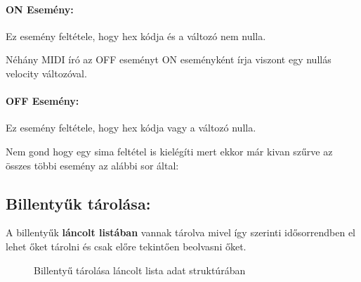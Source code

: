 \documentclass{article}
\begin{document}
\paragraph{ON Esemény:}
Ez esemény feltétele, hogy hex kódja 
és a  változó nem nulla.

\begin{cnote}[Megjegyzés:]
    Néhány MIDI író az OFF eseményt ON eseményként írja viszont
    egy nullás velocity változóval.
\end{cnote}

\paragraph{OFF Esemény:}
Ez esemény feltétele, hogy hex kódja 
vagy a  változó nulla.

\begin{cnote}[Megjegyzés:]
    Nem gond hogy egy sima  feltétel is 
    kielégíti mert ekkor már kivan szűrve az összes többi esemény 
    az alábbi sor által: \\ 
\end{cnote}

\subsection{Billentyűk tárolása:}
A billentyűk \textbf{láncolt listában} vannak tárolva mivel így 
 szerinti idősorrendben el lehet őket
tárolni és csak előre tekintően beolvasni őket.


\begin{figure}[htbp]
    \centering
    \caption{Billentyű tárolása láncolt lista adat struktúrában}
\end{figure}
\end{document}
